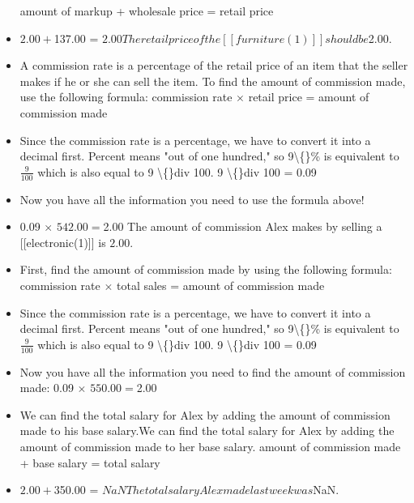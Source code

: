 \documentclass{article}
\begin{document}
\begin{itemize}
                    amount of markup + wholesale price = retail price
  \item $2.00 + $137.00 = $2.00
                    The retail price of the [[furniture(1)]] should be $2.00.
  \item A commission rate is a percentage of the retail price of an item that the seller makes if he or she can sell the item. To find the amount of commission made, use the following formula:
                    commission rate $\times$ retail price = amount of commission made
  \item Since the commission rate is a percentage, we have to convert it into a decimal first. Percent means "out of one hundred," so 9\textbackslash\{\}\% is equivalent to $\frac{9}{100}$ which is also equal to 9 \textbackslash\{\}div 100.
                    9 \textbackslash\{\}div 100 = 0.09
  \item Now you have all the information you need to use the formula above!
  \item 0.09 $\times$ $542.00 = $2.00
                    The amount of commission Alex makes by selling a [[electronic(1)]] is $2.00.$
  \item First, find the amount of commission made by using the following formula:
                    commission rate $\times$ total sales = amount of commission made
  \item Since the commission rate is a percentage, we have to convert it into a decimal first. Percent means "out of one hundred," so 9\textbackslash\{\}\% is equivalent to $\frac{9}{100}$ which is also equal to 9 \textbackslash\{\}div 100.
                    9 \textbackslash\{\}div 100 = 0.09
  \item Now you have all the information you need to find the amount of commission made:
                    0.09 $\times$ $550.00 = $2.00
  \item We can find the total salary for Alex by adding the amount of commission made to his base salary.We can find the total salary for Alex by adding the amount of commission made to her base salary.
                    amount of commission made + base salary = total salary
  \item $2.00 + $350.00 = $NaN
                    The total salary Alex made last week was $NaN.
\end{itemize}
\end{document}
